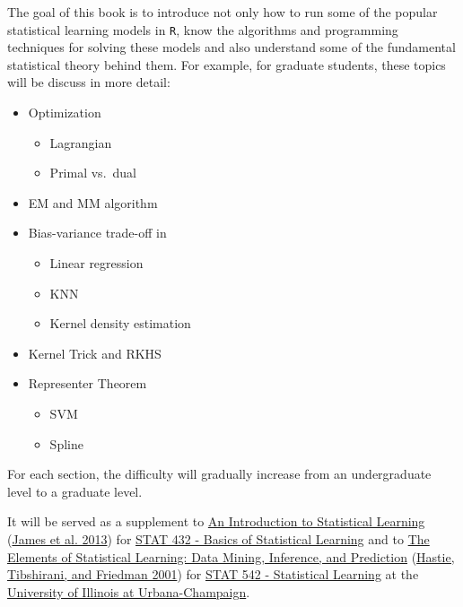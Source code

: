 \documentclass[
]{book}
\providecommand{\tightlist}{%
  \setlength{\itemsep}{0pt}\setlength{\parskip}{0pt}}
\theoremstyle{definition}
\theoremstyle{definition}
\theoremstyle{definition}
\theoremstyle{definition}
\theoremstyle{remark}
\begin{document}
The goal of this book is to introduce not only how to run some of the popular statistical learning models in \texttt{R}, know the algorithms and programming techniques for solving these models and also understand some of the fundamental statistical theory behind them. For example, for graduate students, these topics will be discuss in more detail:

\begin{itemize}
\tightlist
\item
  Optimization

  \begin{itemize}
  \tightlist
  \item
    Lagrangian
  \item
    Primal vs.~dual
  \end{itemize}
\item
  EM and MM algorithm
\item
  Bias-variance trade-off in

  \begin{itemize}
  \tightlist
  \item
    Linear regression
  \item
    KNN
  \item
    Kernel density estimation
  \end{itemize}
\item
  Kernel Trick and RKHS
\item
  Representer Theorem

  \begin{itemize}
  \tightlist
  \item
    SVM
  \item
    Spline
  \end{itemize}
\end{itemize}

For each section, the difficulty will gradually increase from an undergraduate level to a graduate level.

It will be served as a supplement to \href{http://www-bcf.usc.edu/~gareth/ISL/}{An Introduction to Statistical Learning} (\protect\hyperlink{ref-james2013introduction}{James et al. 2013}) for \href{https://go.illinois.edu/stat432}{STAT 432 - Basics of Statistical Learning} and to \href{https://web.stanford.edu/~hastie/ElemStatLearn/}{The Elements of
Statistical Learning: Data Mining, Inference, and Prediction} (\protect\hyperlink{ref-hastie2001elements}{Hastie, Tibshirani, and Friedman 2001}) for \href{https://go.illinois.edu/stat542}{STAT 542 - Statistical Learning} at the \href{http://illinois.edu/}{University of Illinois at Urbana-Champaign}.
\end{document}
